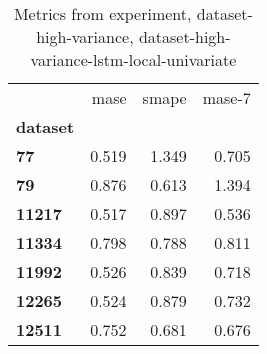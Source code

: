 \begin{table}[h]
\centering
\caption{Metrics from experiment, dataset-high-variance, dataset-high-variance-lstm-local-univariate}
\label{table:dataset-high-variance-lstm-local-univariate-dataset-high-variance}
\begin{tabular}{lrrr}
\toprule
{} &   mase &  smape &  mase-7 \\
\textbf{dataset} &        &        &         \\
\midrule
\textbf{77     } &  0.519 &  1.349 &   0.705 \\
\textbf{79     } &  0.876 &  0.613 &   1.394 \\
\textbf{11217  } &  0.517 &  0.897 &   0.536 \\
\textbf{11334  } &  0.798 &  0.788 &   0.811 \\
\textbf{11992  } &  0.526 &  0.839 &   0.718 \\
\textbf{12265  } &  0.524 &  0.879 &   0.732 \\
\textbf{12511  } &  0.752 &  0.681 &   0.676 \\
\bottomrule
\end{tabular}
\end{table}
